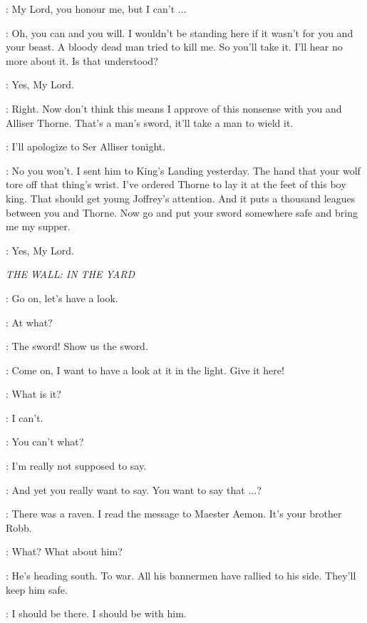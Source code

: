 \JON: My Lord, you honour me, but I can't $\ldots$  

\JEOR: Oh, you can and you will. I wouldn't be standing here if it wasn't for you and your beast. A bloody dead man tried to kill me. So you'll take it. I'll hear no more about it. Is that understood? 

\JON: Yes, My Lord. 

\JEOR: Right. Now don't think this means I approve of this nonsense with you and Alliser Thorne. That's a man's sword, it'll take a man to wield it. 

\JON: I'll apologize to Ser Alliser tonight. 

\JEOR: No you won't. I sent him to King's Landing yesterday. The hand that your wolf tore off that thing's wrist.  I've ordered Thorne to lay it at the feet of this boy king. That should get young Joffrey's attention. And it puts a thousand leagues between you and Thorne. Now go and put your sword somewhere safe and bring me my supper. 

\JON: Yes, My Lord. 


\scene

\textit{THE WALL: IN THE YARD} 


\PYP: Go on, let's have a look. 

\JON: At what? 

\GRENN: The sword! Show us the sword. 

\PYP: Come on, I want to have a look at it in the light. Give it here! 


\JON: What is it? 

\SAM: I can't. 

\JON: You can't what? 

\SAM: I'm really not supposed to say. 

\JON: And yet you really want to say. You want to say that $\ldots$? 

\SAM: There was a raven. I read the message to Maester Aemon. It's your brother Robb. 

\JON: What? What about him? 

\SAM: He's heading south. To war. All his bannermen have rallied to his side. They'll keep him safe. 

\JON: I should be there. I should be with him. 


